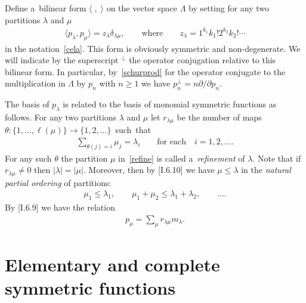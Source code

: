 \documentclass[pdftex]{sigma}
\numberwithin{equation}{section}
\renewcommand\ge{\geqslant}
\renewcommand\le{\leqslant}
\begin{document}
Def\/ine a~bilinear form $\langle\;,\;\rangle$ on the vector space $\Lambda$ by setting for any two
partitions $\lambda$ and $\mu$
\begin{gather}
\label{schurprod}
\langle p_\lambda,p_\mu\rangle=z_\lambda\delta_{\lambda\mu},
\qquad
\text{where}
\qquad
z_\lambda=1^{k_1}k_1!2^{k_2}k_2!\cdots
\end{gather}
in the notation~\eqref{cela}.
This form is obviously symmetric and non-degenerate.
We will indicate by the superscript ${}^\perp$ the operator conjugation relative to this bilinear form.
In particular, by~\eqref{schurprod} for the operator conjugate to the multiplication in $\Lambda$ by $p_n$
with $n\ge1$ we have $ p_n^{\perp}=n\partial /\partial p_n.
{}$

The basis of $p_\lambda$ is related to the basis of monomial symmetric functions as follows.
For any two partitions $\lambda$ and $\mu$ let $r_{\lambda\mu}$ be the number of maps
$\theta:\{1,\ldots,\ell(\mu)\}\to\{1,2,\ldots\}$~such~that
\begin{gather}
\label{refine}
\sum_{\theta(j)=i}\mu_j=\lambda_i
\qquad
\text{for each}
\quad
i=1,2,\ldots.
\end{gather}
For any such $\theta$ the partition $\mu$ in~\eqref{refine} is called a~\textit{refinement} of $\lambda$.
Note that if $r_{\lambda\mu}\neq0$ then $|\lambda|=|\mu|$.
Moreover, then by [I.6.10] we have $\mu\le\lambda$ in the \textit{natural partial ordering} of partitions:
\begin{gather*}
\mu_1\le\lambda_1,\qquad \mu_1+\mu_2\le\lambda_1+\lambda_2,\qquad \ldots.
\end{gather*}
By [I.6.9] we have the relation
\begin{gather}\label{pm}
p_\mu=\sum_\mu r_{\lambda\mu}m_\lambda.
\end{gather}

\section{Elementary and complete symmetric functions}\label{Section4}
\end{document}
